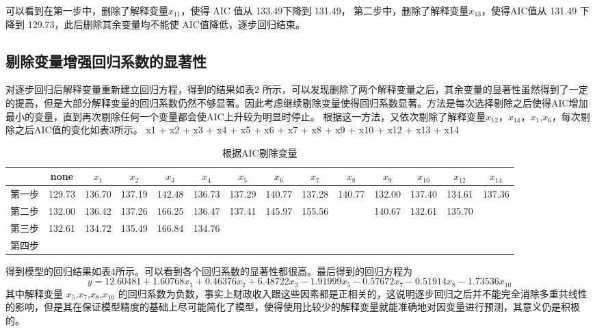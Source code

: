 \documentclass [a4paper]{article}
\begin{document}
可以看到在第一步中，删除了解释变量$x_{11}$，使得 AIC 值从 133.49下降到 131.49，
第二步中，删除了解释变量$x_{13}$，使得AIC值从 131.49 下降到 129.73，此后删除其余变量均不能使 AIC值降低，逐步回归结束。
\subsection{剔除变量增强回归系数的显著性}
对逐步回归后解释变量重新建立回归方程，得到的结果如表2 所示，可以发现删除了两个解释变量之后，其余变量的显著性虽然得到了一定的提高，但是大部分解释变量的回归系数仍然不够显著。因此考虑继续剔除变量使得回归系数显著。方法是每次选择剔除之后使得AIC增加最小的变量，直到再次剔除任何一个变量都会使AIC上升较为明显时停止。
根据这一方法，又依次剔除了解释变量$x_{12}$，$x_{14}$，$x_1$,$x_6$，每次剔除之后AIC值的变化如表3所示。
x1 + x2 + x3 + x4 + x5 + x6 + x7 + x8 + x9 + x10 + x12 +
    x13 + x14
\begin{table}
  \caption{根据AIC剔除变量}
  \label{}
  \tiny
  \centering
  \begin{tabular}{cccccccccccccc}
    \toprule
    &none&$x_1$&$x_2$&$x_3$&$x_4$&$x_5$&$x_6$&$x_7$&$x_8$&$x_9$&$x_{10}$&$x_{12}$&$x_{14}$\\
    \midrule
    第一步&129.73&136.70&137.19&142.48&136.73&137.29&140.77&137.28&140.77&132.00&137.40&134.61&137.36\\
    第二步&132.00&136.42&137.26&166.25&136.47&137.41&145.97&155.56&&140.67&132.61&135.70\\
    第三步&132.61&134.72&135.49&166.84&134.76&\\
    第四步&\\

    \bottomrule
  \end{tabular}

\end{table}

得到模型的回归结果如表4所示。可以看到各个回归系数的显著性都很高。最后得到的回归方程为
$$y = 12.60481 +1.60768x_1 +0.46376x_2+6.48722x_3 -1.91999x_5 -0.57672x_7 -0.51914x_8 - 1.73536x_{10}$$
其中解释变量 $x_5$,$x_7$,$x_8$,$x_{10}$ 的回归系数为负数，事实上财政收入跟这些因素都是正相关的，这说明逐步回归之后并不能完全消除多重共线性的影响，但是其在保证模型精度的基础上尽可能简化了模型，使得使用比较少的解释变量就能准确地对因变量进行预测，其意义仍是积极的。
\begin{table}
  \caption{}
  \label{}

\end{table}
\end{document}
